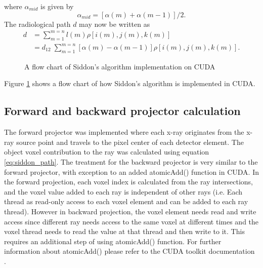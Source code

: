 where $\alpha_{mid}$ is given by 
\begin{equation}
\alpha_{mid} = \left[ \alpha(m) + \alpha(m-1) \right] /2.
\label{eq:siddon_alphamid}
\end{equation}
The radiological path $d$ may now be written as 
\begin{equation}
\begin{aligned}
d &= \sum\limits_{m = 1}^{m = n} l(m) \rho\left[ i(m), j(m), k(m) \right] \\
  &= d_{12} \; \sum\limits_{m = 1}^{m = n} \left[ \alpha(m) - \alpha(m-1) \right] \rho \left[ i(m), j(m), k(m) \right].
\end{aligned}
\label{eq:siddon_path}
\end{equation}

\begin{figure}
\centering
{}
\caption{A flow chart of Siddon's algorithm implementation on CUDA}
\label{fig:siddon_algorithm_flow_chart}
\end{figure}

Figure \ref{fig:siddon_algorithm_flow_chart} shows a flow chart of how Siddon's algorithm is implemented in CUDA.

\subsection{Forward and backward projector calculation}

The forward projector was implemented where each x-ray originates from the x-ray source point and travels to the pixel center of each detector element.  The object voxel contribution to the ray was calculated using equation \ref{eq:siddon_path}.  The treatment for the backward projector is very similar to the forward projector, with exception to an added atomicAdd() function in CUDA.  In the forward projection, each voxel index is calculated from the ray intersections, and the voxel value added to each ray is independent of other rays (i.e. Each thread as read-only access to each voxel element and can be added to each ray thread).  However in backward projection, the voxel element needs read and write access since different ray needs access to the same voxel at different times and the voxel thread needs to read the value at that thread and then write to it.  This requires an additional step of using atomicAdd() function.  For further information about atomicAdd() please refer to the CUDA toolkit documentation \cite{Cudatoolkit}.  

